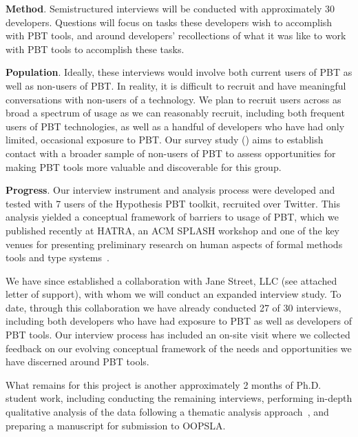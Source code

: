 \textbf{Method}. Semistructured interviews will be conducted with
approximately 30 developers. Questions will
focus on tasks these developers wish to accomplish with PBT tools, and
around developers' recollections of what it was like to work with PBT
tools to accomplish these tasks.

\textbf{Population}. Ideally, these interviews would involve both current users
of PBT as well as non-users of PBT. In reality, it is difficult to recruit and
have meaningful conversations with non-users of a technology. We plan to
recruit users across as broad a spectrum of usage as we can reasonably recruit,
including both frequent users of PBT technologies, as well as a handful of
developers who have had only limited, occasional exposure to PBT. Our survey
study () aims to establish contact with a broader
sample of non-users of PBT to assess opportunities for making PBT tools more
valuable and discoverable for this group.

\textbf{Progress}. Our interview instrument and analysis process were developed
and tested with 7 users of the Hypothesis PBT toolkit, recruited over Twitter.
This analysis yielded a conceptual framework of barriers to usage of PBT, which
we published recently at HATRA, an ACM SPLASH workshop and one of the key
venues for presenting preliminary research on human aspects of formal methods
tools and type systems~\cite{goldstein2022some}.

\iflater{}\fi
We have since established a collaboration with Jane Street, LLC (see
attached letter of support), with whom we will conduct an expanded
interview study. To date, through this collaboration we have already conducted
27 of 30 interviews, including both developers who have had exposure to PBT as
well as developers of PBT tools. Our interview process has included an on-site
visit where we collected feedback on our evolving conceptual framework of the
needs and opportunities we have discerned around PBT tools.

What remains for this project is another approximately 2 months of Ph.D.
student work, including conducting the remaining interviews, performing
in-depth qualitative analysis of the data following a thematic analysis
approach~\cite[Chapter 5]{blandford2016qualitative}, and preparing a manuscript
for submission to OOPSLA.

